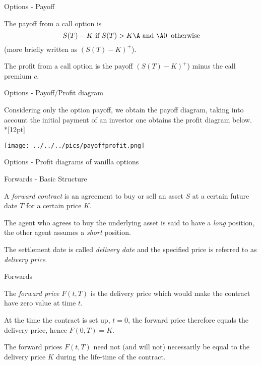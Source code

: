 {Options - Payoff}

  \item<1-> The payoff from a call option is $$ S(T) - K \mbox{ if } S(T)
> K\A \mbox{ and }\A 0 \;\; \mbox{otherwise} $$ (more briefly
written as  $(S(T) - K)^+$).
\item<2-> The profit from a call option is the payoff $(S(T) - K)^+$) minus the call premium $c$.

{Options - Payoff/Profit diagram }

Considering only the option payoff, we obtain the payoff diagram, taking into account the initial payment of an investor one obtains the profit diagram below.\\*[12pt]

\begin{center}
\texttt{[image: ../../../pics/payoffprofit.png]}
\end{center}

{Options - Profit diagrams of vanilla options}
\begin{figure}
  \centering
   \qquad
\end{figure}


{Forwards - Basic Structure}

\item<1->
A {\it forward contract}
is an agreement to buy or sell an asset $S$ at a certain future
date $T$ for a certain price $K$.
\item<2->
The agent who agrees to
buy the underlying asset is said to have a {\it long} position,
the other agent assumes a {\it short} position.
\item<3-> The settlement
date is called {\it delivery date} and the specified price is
referred to as {\it delivery price}.

{Forwards}
\item<1-> The {\it forward
price} $F(t,T)$ is the delivery price which would make the
contract have zero value at time $t$.
\item<2-> At the time the contract is set up, $t=0$,
the forward price therefore equals the delivery price, hence
$F(0,T) = K$.
\item<3->
The forward prices $F(t,T)$ need not (and will not)
necessarily be equal to the delivery price $K$ during the
life-time of the contract.

